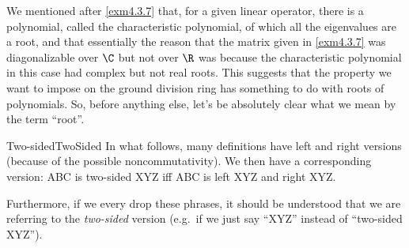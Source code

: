 We mentioned after \cref{exm4.3.7} that, for a given linear operator, there is a polynomial, called the characteristic polynomial, of which all the eigenvalues are a root, and that essentially the reason that the matrix given in \cref{exm4.3.7} was diagonalizable over $\C$ but not over $\R$ was because the characteristic polynomial in this case had complex but not real roots.  This suggests that the property we want to impose on the ground division ring has something to do with roots of polynomials.  So, before anything else, let's be absolutely clear what we mean by the term ``root''.
\begin{cnv}{Two-sided}{TwoSided}
	In what follows, many definitions have left and right versions (because of the possible noncommutativity).  We then have a corresponding  version:  ABC is two-sided XYZ iff ABC is left XYZ and right XYZ.
	
	Furthermore, if we every drop these phrases, it should be understood that we are referring to the \emph{two-sided} version (e.g.~if we just say ``XYZ'' instead of ``two-sided XYZ'').
\end{cnv}
